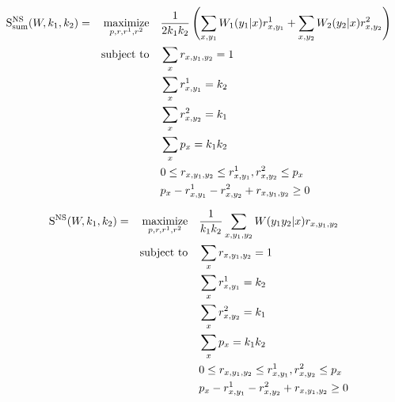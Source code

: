 \begin{prop}
\begin{equation}
  \begin{aligned}
    \mathrm{S}_{\text{sum}}^{\mathrm{NS}}(W,k_1,k_2) = &&\underset{p,r,r^1,r^2}{\operatorname{\text{maximize}}} &&& \frac{1}{2k_1k_2}\left(\sum_{x,y_1} W_1(y_1|x)r^1_{x,y_1} + \sum_{x,y_2} W_2(y_2|x)r^2_{x,y_2}\right)\\
    &&\operatorname{\text{subject to}} &&& \sum_{x} r_{x,y_1,y_2} = 1\\
    &&&&&\sum_{x} r^1_{x,y_1} = k_2\\
    &&&&& \sum_{x} r^2_{x,y_2} = k_1\\
    &&&&& \sum_{x} p_x = k_1k_2\\
    &&&&& 0 \leq r_{x,y_1,y_2} \leq r^1_{x,y_1}, r^2_{x,y_2} \leq p_x\\
    &&&&& p_x - r^1_{x,y_1} - r^2_{x,y_2} + r_{x,y_1,y_2} \geq 0\\
  \end{aligned}
\end{equation}

\begin{equation}
  \begin{aligned}
    \mathrm{S}^{\mathrm{NS}}(W,k_1,k_2) = &&\underset{p,r,r^1,r^2}{\operatorname{\text{maximize}}} &&& \frac{1}{k_1k_2}\sum_{x,y_1,y_2} W(y_1y_2|x)r_{x,y_1,y_2}\\
    &&\operatorname{\text{subject to}} &&& \sum_{x} r_{x,y_1,y_2} = 1\\
    &&&&&\sum_{x} r^1_{x,y_1} = k_2\\
    &&&&& \sum_{x} r^2_{x,y_2} = k_1\\
    &&&&& \sum_{x} p_x = k_1k_2\\
    &&&&& 0 \leq r_{x,y_1,y_2} \leq r^1_{x,y_1}, r^2_{x,y_2} \leq p_x\\
    &&&&& p_x - r^1_{x,y_1} - r^2_{x,y_2} + r_{x,y_1,y_2} \geq 0\\
  \end{aligned}
\end{equation}
\end{prop}
